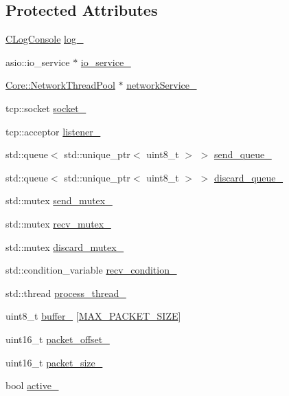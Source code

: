 \subsection*{Protected Attributes}
\begin{DoxyCompactItemize}
\item 
\hyperlink{classCore_1_1CLogConsole}{C\+Log\+Console} \hyperlink{classCore_1_1CNetwork__Asio_a0330ebff658531de39d4ab56ebfd3ef0}{log\+\_\+}
\item 
asio\+::io\+\_\+service $\ast$ \hyperlink{classCore_1_1CNetwork__Asio_ae8f0c7bd6d91e2c6f08b1a9c0c3d0e79}{io\+\_\+service\+\_\+}
\item 
\hyperlink{classCore_1_1NetworkThreadPool}{Core\+::\+Network\+Thread\+Pool} $\ast$ \hyperlink{classCore_1_1CNetwork__Asio_a2cd9b91538970582937b8f03df08bf4c}{network\+Service\+\_\+}
\item 
tcp\+::socket \hyperlink{classCore_1_1CNetwork__Asio_a57eebf57efe1aa1728b3e3746cde10fb}{socket\+\_\+}
\item 
tcp\+::acceptor \hyperlink{classCore_1_1CNetwork__Asio_ae41e74304ef2de1b82bc6467b13fdb6f}{listener\+\_\+}
\item 
std\+::queue$<$ std\+::unique\+\_\+ptr$<$ uint8\+\_\+t $>$ $>$ \hyperlink{classCore_1_1CNetwork__Asio_addc81f6507aaaefff55125bbd14eabae}{send\+\_\+queue\+\_\+}
\item 
std\+::queue$<$ std\+::unique\+\_\+ptr$<$ uint8\+\_\+t $>$ $>$ \hyperlink{classCore_1_1CNetwork__Asio_ade3431dccfe1d5d1faf9c539031c80be}{discard\+\_\+queue\+\_\+}
\item 
std\+::mutex \hyperlink{classCore_1_1CNetwork__Asio_a957a4eb9ab4221cf7056a902c42796f3}{send\+\_\+mutex\+\_\+}
\item 
std\+::mutex \hyperlink{classCore_1_1CNetwork__Asio_acc7289205677c219ac90c8c1445d0770}{recv\+\_\+mutex\+\_\+}
\item 
std\+::mutex \hyperlink{classCore_1_1CNetwork__Asio_a5d307130d59994026ce19f258dd31048}{discard\+\_\+mutex\+\_\+}
\item 
std\+::condition\+\_\+variable \hyperlink{classCore_1_1CNetwork__Asio_a928266d06111ae3e88fcc6608cd88cec}{recv\+\_\+condition\+\_\+}
\item 
std\+::thread \hyperlink{classCore_1_1CNetwork__Asio_a8434441ee967ff416a48f4de34e07e04}{process\+\_\+thread\+\_\+}
\item 
uint8\+\_\+t \hyperlink{classCore_1_1CNetwork__Asio_a41089e546d53aba73073ccc49cf96fd8}{buffer\+\_\+} \mbox{[}\hyperlink{cnetwork__asio_8h_a879456c3b8e2853f7044d764e9c180d4}{M\+A\+X\+\_\+\+P\+A\+C\+K\+E\+T\+\_\+\+S\+I\+ZE}\mbox{]}
\item 
uint16\+\_\+t \hyperlink{classCore_1_1CNetwork__Asio_a614aae7d1116f4dd01516e7858f3aca0}{packet\+\_\+offset\+\_\+}
\item 
uint16\+\_\+t \hyperlink{classCore_1_1CNetwork__Asio_a25301a85d636297711946f55d6664cff}{packet\+\_\+size\+\_\+}
\item 
bool \hyperlink{classCore_1_1CNetwork__Asio_abedfebd59927120d57e68b724e8431e6}{active\+\_\+}
\end{DoxyCompactItemize}


